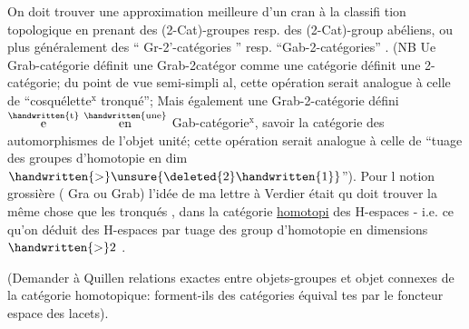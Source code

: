 
On doit trouver une approximation meilleure d'un cran à la classifi
tion topologique en prenant des (2-Cat)-groupes resp. des (2-Cat)-group
abéliens, ou plus généralement des `` Gr-2'-catégories '' resp.
``Gab-2-catégories'' . (NB Ue Grab-catégorie définit une Grab-2catégor
comme une catégorie définit une 2-catégorie; du point de vue semi-simpli
al, cette opération serait analogue à celle de ``cosquélette$^{\text{x}}$ tronqué'';
Mais également une Grab-2-catégorie défini$\overset{\handwritten{\text{t}}}{\text{e}}$ $\overset{\handwritten{\text{une}}}{\text{en}}$ Gab-catégorie$^{\text{x}}$, savoir la
catégorie des automorphismes de l'objet unité; cette  opération serait
analogue à celle de ``tuage des groupes d'homotopie en dim $\handwritten{>}\unsure{\deleted{2}\handwritten{1}}$''). Pour l
notion grossière ( Gra ou Grab) l'idée de ma lettre à Verdier était qu
doit trouver la même chose que les tronqués , dans la catégorie \uline{homotopi}
des H-espaces - i.e. ce qu'on déduit des H-espaces par tuage des group
d'homotopie en dimensions $\handwritten{>}2$ .

(Demander à Quillen relations exactes entre objets-groupes et objet
connexes de la catégorie homotopique: forment-ils des catégories équival
tes par le foncteur espace des lacets).

